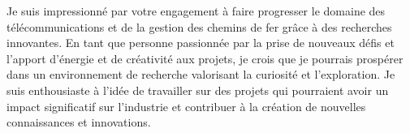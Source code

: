 \documentclass[11pt, a4paper]{awesome-cv}
\begin{document}
\begin{cvletter}
Je suis impressionné par votre engagement à faire progresser le domaine des télécommunications et de la gestion des chemins de fer grâce à des recherches innovantes. En tant que personne passionnée par la prise de nouveaux défis et l'apport d'énergie et de créativité aux projets, je crois que je pourrais prospérer dans un environnement de recherche valorisant la curiosité et l'exploration. Je suis enthousiaste à l'idée de travailler sur des projets qui pourraient avoir un impact significatif sur l'industrie et contribuer à la création de nouvelles connaissances et innovations.

\end{cvletter}


\makeletterclosing
\end{document}
